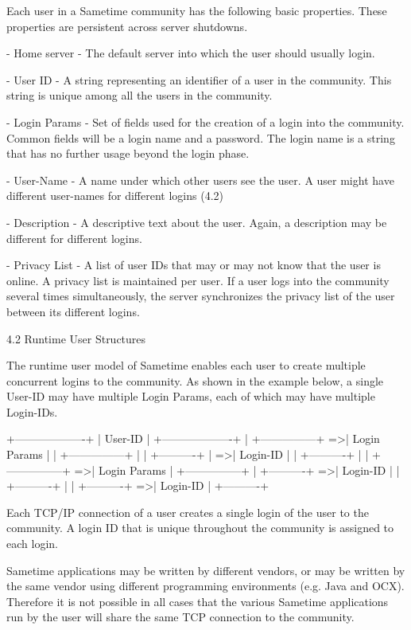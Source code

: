\documentclass[titlepage,oneside]{book}
\begin{document}
Each user in a Sametime community has the following basic properties.
These properties are persistent across server shutdowns.

- Home server - The default server into which the user should usually
login.

- User ID - A string representing an identifier of a user in the
community. This string is unique among all the users in the community.

- Login Params - Set of fields used for the creation of a login into
the community. Common fields will be a login name and a password. The
login name is a string that has no further usage beyond the login
phase.

- User-Name - A name under which other users see the user. A user might
have different user-names for different logins
(4.2)

- Description - A descriptive text about the user. Again, a description
may be different for different logins.

- Privacy List - A list of user IDs that may or may not know that the
user is online. A privacy list is maintained per user. If a user logs
into the community several times simultaneously, the server
synchronizes the privacy list of the user between its different logins.


4.2 Runtime User Structures


The runtime user model of Sametime enables each user to create multiple
concurrent logins to the community. As shown in the example below, a
single User-ID may have multiple Login Params, each of which may have
multiple Login-IDs.

   +-------------------+
   | User-ID           |
   +-------------------+
    | +---------------+
    =>| Login Params  |
    | +---------------+
    |   | +----------+
    |   =>| Login-ID |
    |     +----------+
    |
    | +---------------+
    =>| Login Params  |
      +---------------+
        | +----------+
        =>| Login-ID |
        | +----------+
        |
        | +----------+
        =>| Login-ID |
          +----------+

Each TCP/IP connection of a user creates a single login of the user to
the community. A login ID that is unique throughout the community is
assigned to each login.

Sametime applications may be written by different vendors, or may be
written by the same vendor using different programming environments
(e.g. Java and OCX). Therefore it is not possible in all cases that the
various Sametime applications run by the user will share the same TCP
connection to the community.
\end{document}
